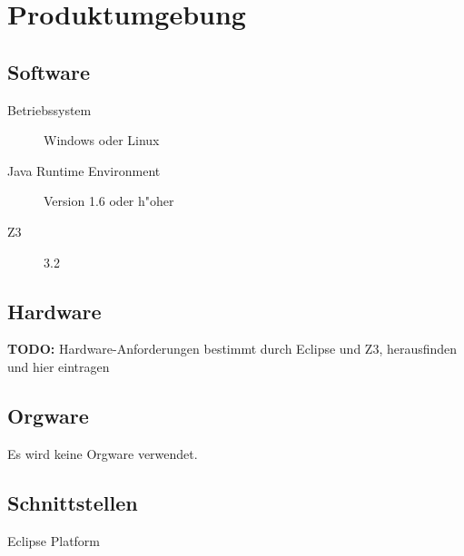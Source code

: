 \section{Produktumgebung}%

\subsection{Software}%

\begin{description}%
    \item [Betriebssystem] \see Windows oder \see Linux%
    \item [\see Java Runtime Environment] Version 1.6 oder h"oher%
    \item [\see Z3] 3.2%
\end{description}%

\subsection{Hardware}%

\textbf{TODO:} Hardware-Anforderungen bestimmt durch Eclipse und Z3, herausfinden und hier eintragen%

\subsection{Orgware}%

Es wird keine \see Orgware verwendet.%

\subsection{Schnittstellen}%

\begin{description}%
    \item [\see Eclipse Platform]%
\end{description}%
